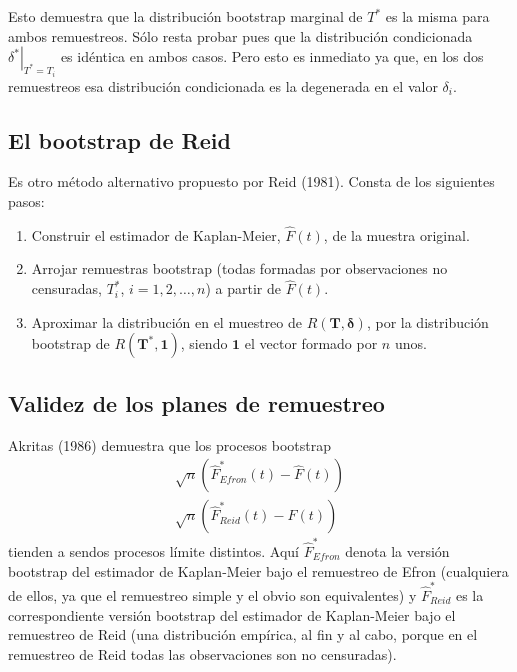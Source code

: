 \documentclass[
]{book}
\theoremstyle{break}
\theoremstyle{definition}
\theoremstyle{definition}
\theoremstyle{definition}
\theoremstyle{definition}
\theoremstyle{remark}
\begin{document}
Esto demuestra que la distribución bootstrap marginal de \(T^{\ast}\) es
la misma para ambos remuestreos. Sólo resta probar pues que la
distribución condicionada
\(\left. \delta^{\ast}\right\vert _{T^{\ast}=T_i}\) es idéntica en
ambos casos. Pero esto es inmediato ya que, en los dos remuestreos esa
distribución condicionada es la degenerada en el valor
\(\delta _i\).

\hypertarget{bootcen-reid}{%
\subsection{El bootstrap de Reid}\label{bootcen-reid}}

Es otro método alternativo propuesto por Reid (1981). Consta de los
siguientes pasos:

\begin{enumerate}
\def\labelenumi{\arabic{enumi}.}
\item
  Construir el estimador de Kaplan-Meier, \(\hat{F}\left( t \right)\),
  de la muestra original.
\item
  Arrojar remuestras bootstrap (todas formadas por observaciones no
  censuradas, \(T_i^{\ast}\), \(i=1,2,\ldots ,n\)) a partir de
  \(\hat{F}\left(t \right)\).
\item
  Aproximar la distribución en el muestreo de \(R\left( \mathbf{T},\boldsymbol{\delta} \right)\), por la
  distribución bootstrap de
  \(R\left( \mathbf{T}^{\ast},\mathbf{1} \right)\),
  siendo \(\mathbf{1}\) el vector formado
  por \(n\) unos.
\end{enumerate}

\hypertarget{validez-de-los-planes-de-remuestreo}{%
\subsection{Validez de los planes de remuestreo}\label{validez-de-los-planes-de-remuestreo}}

Akritas (1986) demuestra que los procesos bootstrap
\[\begin{aligned}
\sqrt{n}\left( \hat{F}^{\ast}_{Efron}\left( t \right) 
- \hat{F}\left( t \right) \right) \\ 
\sqrt{n}\left( \hat{F}^{\ast}_{Reid} \left( t \right) 
- \hat{F}\left( t \right) \right)
\end{aligned}\]
tienden a sendos procesos límite distintos. Aquí
\(\hat{F}^{\ast}_{Efron}\) denota la versión bootstrap del estimador
de Kaplan-Meier bajo el remuestreo de Efron (cualquiera de ellos, ya que
el remuestreo simple y el obvio son equivalentes) y
\(\hat{F}^{\ast}_{Reid}\) es la correspondiente versión bootstrap del
estimador de Kaplan-Meier bajo el remuestreo de Reid (una distribución
empírica, al fin y al cabo, porque en el remuestreo de Reid todas las
observaciones son no censuradas).
\end{document}
